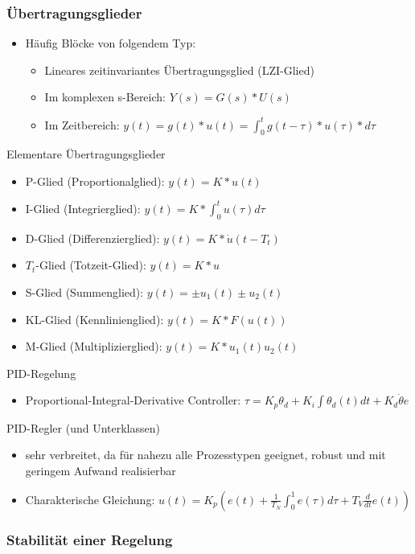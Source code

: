 \documentclass[paper=a4, fontsize=11pt]{scrartcl} %
\numberwithin{equation}{section} %
\numberwithin{figure}{section} %
\numberwithin{table}{section} %
\begin{document}
\subsubsection{Übertragungsglieder}

\begin{itemize}
\item Häufig Blöcke von folgendem Typ:
\begin{itemize}
\item Lineares zeitinvariantes Übertragungsglied (LZI-Glied)
\item Im komplexen s-Bereich: $Y(s) = G(s) * U(s)$
\item Im Zeitbereich: $y(t) = g(t) * u(t) = \int_0^t g(t-\tau) * u(\tau) * d\tau$
\end{itemize}
\end{itemize}

Elementare Übertragungsglieder
\begin{itemize}
\item P-Glied (Proportionalglied): $y(t) = K * u(t)$
\item I-Glied (Integrierglied): $y(t) = K * \int_0^t u(\tau) d\tau$
\item D-Glied (Differenzierglied): $y(t) = K * \dot u(t-T_t)$
\item $T_t$-Glied (Totzeit-Glied): $y(t) = K * u$
\item S-Glied (Summenglied): $y(t) = \pm u_1(t) \pm u_2(t)$
\item KL-Glied (Kennlinienglied): $y(t) = K * F(u(t))$
\item M-Glied (Multiplizierglied): $y(t) = K * u_1(t) u_2(t)$
\end{itemize}

PID-Regelung
\begin{itemize}
\item Proportional-Integral-Derivative Controller: $\tau = K_p \theta_d + K_i \int \theta_d(t)dt + K_d \dot \theta e$
\end{itemize}

PID-Regler (und Unterklassen)
\begin{itemize}
\item sehr verbreitet, da für nahezu alle Prozesstypen geeignet, robust und mit geringem Aufwand realisierbar
\item Charakterische Gleichung: $u(t) = K_p(e(t) + \frac{1}{T_N} \int_0^1 e(\tau) d \tau + T_V \frac{d}{dt} e(t)) $
\end{itemize}

\subsubsection{Stabilität einer Regelung}
\end{document}
